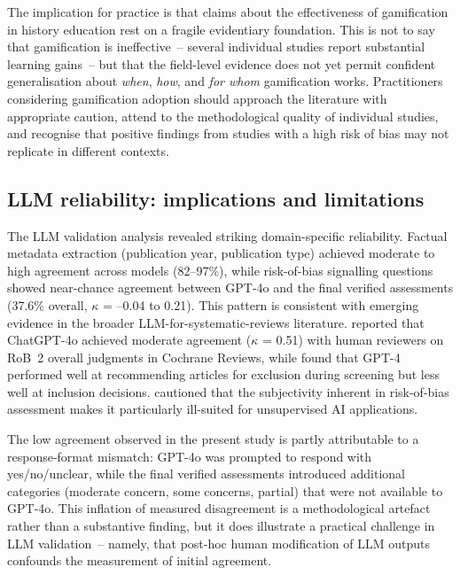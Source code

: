 \documentclass[etq]{acnsart}
\begin{document}
	The implication for practice is that claims about the effectiveness of gamification in history education rest on a fragile evidentiary foundation. This is not to say that gamification is ineffective~-- several individual studies report substantial learning gains~-- but that the field-level evidence does not yet permit confident generalisation about \emph{when}, \emph{how}, and \emph{for whom} gamification works. Practitioners considering gamification adoption should approach the literature with appropriate caution, attend to the methodological quality of individual studies, and recognise that positive findings from studies with a high risk of bias may not replicate in different contexts.
	
	\subsection{LLM reliability: implications and limitations}
	\label{sec:discussion_llm}
	
	The LLM validation analysis revealed striking domain-specific reliability. Factual metadata extraction (publication year, publication type) achieved moderate to high agreement across models (82--97\%), while risk-of-bias signalling questions showed near-chance agreement between GPT-4o and the final verified assessments (37.6\% overall, $\kappa$ = --0.04 to 0.21). This pattern is consistent with emerging evidence in the broader LLM-for-systematic-reviews literature. \citet{Taneri2025} reported that ChatGPT-4o achieved moderate agreement ($\kappa$ = 0.51) with human reviewers on RoB~2 overall judgments in Cochrane Reviews, while \citet{Rubinstein2025} found that GPT-4 performed well at recommending articles for exclusion during screening but less well at inclusion decisions. \citet{MalekiKarami2024} cautioned that the subjectivity inherent in risk-of-bias assessment makes it particularly ill-suited for unsupervised AI applications.
	
	The low agreement observed in the present study is partly attributable to a response-format mismatch: GPT-4o was prompted to respond with yes/no/unclear, while the final verified assessments introduced additional categories (moderate concern, some concerns, partial) that were not available to GPT-4o. This inflation of measured disagreement is a methodological artefact rather than a substantive finding, but it does illustrate a practical challenge in LLM validation~-- namely, that post-hoc human modification of LLM outputs confounds the measurement of initial agreement.
	
\end{document}
